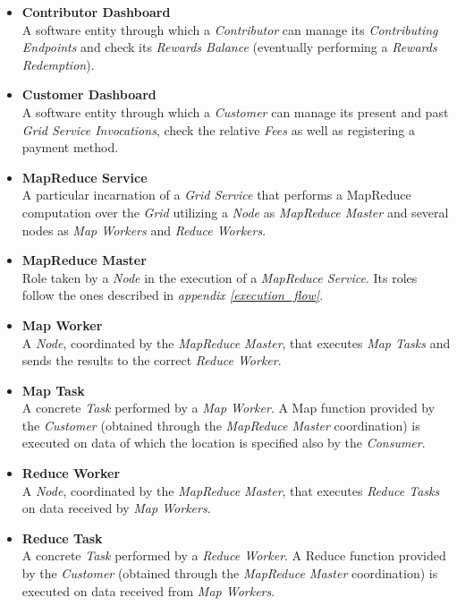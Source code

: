 \begin{itemize}
    \item \textbf{Contributor Dashboard}\label{contributor_dashboard}\\
    A software entity through which a \textit{Contributor} can manage its \textit{Contributing Endpoints} and check its \textit{Rewards Balance} (eventually performing a \textit{Rewards Redemption}).
    \item \textbf{Customer Dashboard}\label{customer_dashboard}\\
    A software entity through which a \textit{Customer} can manage its present and past \textit{Grid Service Invocations}, check the relative \textit{Fees} as well as registering a payment method.
    \item \textbf{MapReduce Service}\label{mapreduce_service_ul}\\
    A particular incarnation of a \textit{Grid Service} that performs a MapReduce computation over the \textit{Grid} utilizing a \textit{Node} as \textit{MapReduce Master} and several nodes as \textit{Map Workers} and \textit{Reduce Workers}.
    \item \textbf{MapReduce Master}\label{mapreduce_master}\\
    Role taken by a \textit{Node} in the execution of a \textit{MapReduce Service}. Its roles follow the ones described in \textit{appendix \ref{execution_flow}}.
    \item \textbf{Map Worker}\label{map_worker}\\
    A \textit{Node}, coordinated by the \textit{MapReduce Master}, that executes \textit{Map Tasks} and sends the results to the correct \textit{Reduce Worker}.
    \item \textbf{Map Task}\label{map_task}\\
    A concrete \textit{Task} performed by a \textit{Map Worker}. A Map function provided by the \textit{Customer} (obtained through the \textit{MapReduce Master} coordination) is executed on data of which the location is specified also by the \textit{Consumer}.
    \item \textbf{Reduce Worker}\label{reduce_worker}\\
    A \textit{Node}, coordinated by the \textit{MapReduce Master}, that executes \textit{Reduce Tasks} on data received by \textit{Map Workers}.
    \item \textbf{Reduce Task}\label{reduce_task}\\
    A concrete \textit{Task} performed by a \textit{Reduce Worker}. A Reduce function provided by the \textit{Customer} (obtained through the \textit{MapReduce Master} coordination) is executed on data received from \textit{Map Workers}.

\end{itemize}
